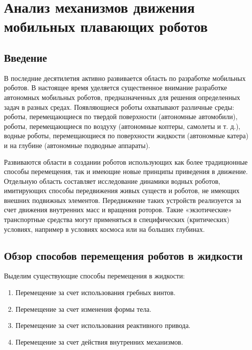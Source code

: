 \chapter{Анализ механизмов движения мобильных плавающих роботов}\label{ch:ch1}

\section{Введение}\label{sec:ch1/sec1}

В последние десятилетия активно развивается область по разработке мобильных роботов. В настоящее время уделяется существенное внимание разработке автономных мобильных роботов, предназначенных для решения определенных задач в разных средах. Появляющиеся роботы охватывают различные среды: роботы, перемещающиеся по твердой поверхности  (автономные автомобили), роботы, перемещающиеся по воздуху (автономные коптеры, самолеты и т. д.), водные роботы, перемещающиеся по поверхности жидкости (автономные катера) и на глубине (автономные подводные аппараты). 

Развиваются области в создании роботов использующих как более традиционные способы перемещения, так и имеющие новые принципы приведения в движение. Отдельную область составляет исследование динамики водных роботов, имитирующих способы передвижения живых существ и роботов, не имеющих внешних подвижных элементов. Передвижение таких устройств реализуется за счет движения внутренних масс и вращения роторов. Такие «экзотические» транспортные средства могут применяться в специфических (критических) условиях, например в условиях космоса или на больших глубинах.

\section{Обзор способов перемещения роботов в жидкости}\label{sec:ch1/sec21}

Выделим существующие способы перемещения в жидкости:

\begin{enumerate}
	\item Перемещение за счет использования гребных винтов.
	\item Перемещение за счет изменения формы тела.
	\item Перемещение за счет использования реактивного привода.
	\item Перемещение за счет действия внутренних механизмов.
\end{enumerate}

